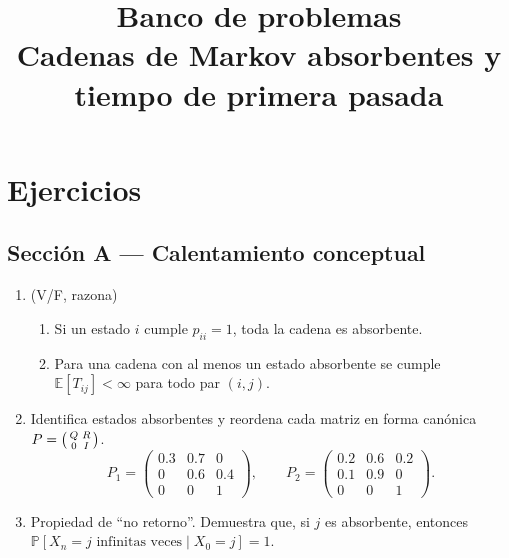 \documentclass[11pt,spanish]{article}
\title{\large\bfseries Banco de problemas\\[2pt]
        {\normalsize Cadenas de Markov absorbentes y tiempo de primera pasada}}
\author{}
\date{}
\newcommand{\E}{\mathbb{E}}
\newcommand{\Prob}{\mathbb{P}}
\begin{document}
\maketitle

\section*{Ejercicios}

\subsection*{Sección A — Calentamiento conceptual}
\begin{enumerate}[label=\textbf{A.\arabic*}]
  \item (V/F, razona)  
        \begin{enumerate}[label=\alph*)]
          \item Si un estado \(i\) cumple \(p_{ii}=1\), toda la cadena es absorbente.  
          \item Para una cadena con al menos un estado absorbente se cumple
                \(\E[T_{ij}]<\infty\) para todo par \((i,j)\).
        \end{enumerate}

  \item Identifica estados absorbentes y reordena cada matriz en forma canónica \(P=\begin{psmallmatrix}Q&R\\0&I\end{psmallmatrix}\).  
        \[
          P_{1}=\begin{pmatrix}
                  0.3 & 0.7 & 0   \\
                  0   & 0.6 & 0.4 \\
                  0   & 0   & 1
                \end{pmatrix},
          \qquad
          P_{2}=\begin{pmatrix}
                  0.2 & 0.6 & 0.2\\
                  0.1 & 0.9 & 0  \\
                  0   & 0   & 1
                \end{pmatrix}.
        \]

  \item Propiedad de “no retorno”.  
        Demuestra que, si \(j\) es absorbente, entonces
        \(\Prob[X_n=j \text{ infinitas veces}\mid X_0=j]=1\).
\end{enumerate}
\end{document}
